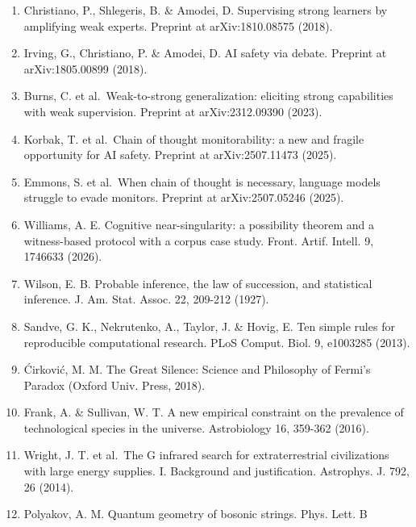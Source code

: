 \begin{enumerate}
\item
  Christiano, P., Shlegeris, B. \& Amodei, D. Supervising strong
  learners by amplifying weak experts. Preprint at arXiv:1810.08575
  (2018).\\
\item
  Irving, G., Christiano, P. \& Amodei, D. AI safety via debate.
  Preprint at arXiv:1805.00899 (2018).\\
\item
  Burns, C. et al.~Weak-to-strong generalization: eliciting strong
  capabilities with weak supervision. Preprint at arXiv:2312.09390
  (2023).\\
\item
  Korbak, T. et al.~Chain of thought monitorability: a new and fragile
  opportunity for AI safety. Preprint at arXiv:2507.11473 (2025).\\
\item
  Emmons, S. et al.~When chain of thought is necessary, language models
  struggle to evade monitors. Preprint at arXiv:2507.05246 (2025).\\
\item
  Williams, A. E. Cognitive near-singularity: a possibility theorem and
  a witness-based protocol with a corpus case study. Front. Artif.
  Intell. 9, 1746633 (2026).\\
\item
  Wilson, E. B. Probable inference, the law of succession, and
  statistical inference. J. Am. Stat. Assoc. 22, 209-212 (1927).\\
\item
  Sandve, G. K., Nekrutenko, A., Taylor, J. \& Hovig, E. Ten simple
  rules for reproducible computational research. PLoS Comput. Biol. 9,
  e1003285 (2013).\\
\item
  Ćirković, M. M. The Great Silence: Science and Philosophy of Fermi's
  Paradox (Oxford Univ. Press, 2018).\\
\item
  Frank, A. \& Sullivan, W. T. A new empirical constraint on the
  prevalence of technological species in the universe. Astrobiology 16,
  359-362 (2016).\\
\item
  Wright, J. T. et al.~The G infrared search for extraterrestrial
  civilizations with large energy supplies. I. Background and
  justification. Astrophys. J. 792, 26 (2014).\\
\item
  Polyakov, A. M. Quantum geometry of bosonic strings. Phys. Lett. B

\end{enumerate}
